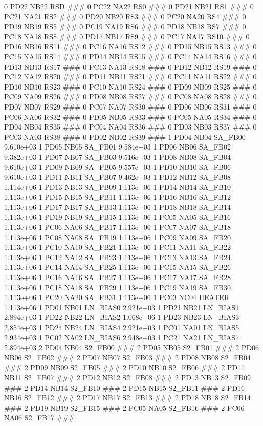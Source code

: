 0 PD22 NB22 RSD ### 
0 PC22 NA22 RS0 ### 
0 PD21 NB21 RS1 ### 
0 PC21 NA21 RS2 ### 
0 PD20 NB20 RS3 ### 
0 PC20 NA20 RS4 ### 
0 PD19 NB19 RS5 ### 
0 PC19 NA19 RS6 ### 
0 PD18 NB18 RS7 ### 
0 PC18 NA18 RS8 ### 
0 PD17 NB17 RS9 ### 
0 PC17 NA17 RS10 ### 
0 PD16 NB16 RS11 ### 
0 PC16 NA16 RS12 ### 
0 PD15 NB15 RS13 ### 
0 PC15 NA15 RS14 ### 
0 PD14 NB14 RS15 ### 
0 PC14 NA14 RS16 ### 
0 PD13 NB13 RS17 ### 
0 PC13 NA13 RS18 ### 
0 PD12 NB12 RS19 ### 
0 PC12 NA12 RS20 ### 
0 PD11 NB11 RS21 ### 
0 PC11 NA11 RS22 ### 
0 PD10 NB10 RS23 ### 
0 PC10 NA10 RS24 ### 
0 PD09 NB09 RS25 ### 
0 PC09 NA09 RS26 ### 
0 PD08 NB08 RS27 ### 
0 PC08 NA08 RS28 ### 
0 PD07 NB07 RS29 ### 
0 PC07 NA07 RS30 ### 
0 PD06 NB06 RS31 ### 
0 PC06 NA06 RS32 ### 
0 PD05 NB05 RS33 ### 
0 PC05 NA05 RS34 ### 
0 PD04 NB04 RS35 ### 
0 PC04 NA04 RS36 ### 
0 PD03 NB03 RS37 ### 
0 PC03 NA03 RS38 ### 
0 PD02 NB02 RS39 ### 
1 PD04 NB04 SA_FB00 9.610e+03 
1 PD05 NB05 SA_FB01 9.584e+03 
1 PD06 NB06 SA_FB02 9.382e+03 
1 PD07 NB07 SA_FB03 9.516e+03 
1 PD08 NB08 SA_FB04 9.610e+03 
1 PD09 NB09 SA_FB05 9.557e+03 
1 PD10 NB10 SA_FB06 9.610e+03 
1 PD11 NB11 SA_FB07 9.462e+03 
1 PD12 NB12 SA_FB08 1.114e+06 
1 PD13 NB13 SA_FB09 1.113e+06 
1 PD14 NB14 SA_FB10 1.113e+06 
1 PD15 NB15 SA_FB11 1.113e+06 
1 PD16 NB16 SA_FB12 1.113e+06 
1 PD17 NB17 SA_FB13 1.113e+06 
1 PD18 NB18 SA_FB14 1.113e+06 
1 PD19 NB19 SA_FB15 1.113e+06 
1 PC05 NA05 SA_FB16 1.113e+06 
1 PC06 NA06 SA_FB17 1.113e+06 
1 PC07 NA07 SA_FB18 1.113e+06 
1 PC08 NA08 SA_FB19 1.113e+06 
1 PC09 NA09 SA_FB20 1.113e+06 
1 PC10 NA10 SA_FB21 1.113e+06 
1 PC11 NA11 SA_FB22 1.113e+06 
1 PC12 NA12 SA_FB23 1.113e+06 
1 PC13 NA13 SA_FB24 1.113e+06 
1 PC14 NA14 SA_FB25 1.113e+06 
1 PC15 NA15 SA_FB26 1.113e+06 
1 PC16 NA16 SA_FB27 1.113e+06 
1 PC17 NA17 SA_FB28 1.113e+06 
1 PC18 NA18 SA_FB29 1.113e+06 
1 PC19 NA19 SA_FB30 1.113e+06 
1 PC20 NA20 SA_FB31 1.113e+06 
1 PC03 NC04 HEATER 1.113e+06 
1 PD01 NB01 LN_BIAS0 2.921e+03 
1 PD21 NB21 LN_BIAS1 2.894e+03 
1 PD22 NB22 LN_BIAS2 1.068e+06 
1 PD23 NB23 LN_BIAS3 2.854e+03 
1 PD24 NB24 LN_BIAS4 2.921e+03 
1 PC01 NA01 LN_BIAS5 2.934e+03 
1 PC02 NA02 LN_BIAS6 2.948e+03 
1 PC21 NA21 LN_BIAS7 2.894e+03 
2 PD04 NB04 S2_FB00 ### 
2 PD05 NB05 S2_FB01 ### 
2 PD06 NB06 S2_FB02 ### 
2 PD07 NB07 S2_FB03 ### 
2 PD08 NB08 S2_FB04 ### 
2 PD09 NB09 S2_FB05 ### 
2 PD10 NB10 S2_FB06 ### 
2 PD11 NB11 S2_FB07 ### 
2 PD12 NB12 S2_FB08 ### 
2 PD13 NB13 S2_FB09 ### 
2 PD14 NB14 S2_FB10 ### 
2 PD15 NB15 S2_FB11 ### 
2 PD16 NB16 S2_FB12 ### 
2 PD17 NB17 S2_FB13 ### 
2 PD18 NB18 S2_FB14 ### 
2 PD19 NB19 S2_FB15 ### 
2 PC05 NA05 S2_FB16 ### 
2 PC06 NA06 S2_FB17 ### 
